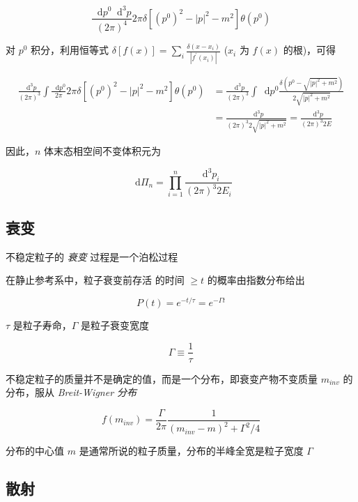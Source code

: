 \documentclass[oneside,a4paper,openany,11pt]{ctexbook}
\newcommand*{\dif}{\mathop{}\!\mathrm{d}} %
\begin{document}
\begin{equation}
    \frac{\dif p^0 \dif^3 p}{(2\pi)^4} 2\pi\delta [(p^0)^2-|p|^2-m^2] \theta(p^0)
\end{equation}

对 $p^0$ 积分，利用恒等式 $\delta[f(x)] = \sum_i \frac{\delta(x-x_i)}{|f^\prime(x_i)|}$ ($x_i$ 为 $f(x)$ 的根)，可得

\begin{align}
    \frac{\dif^3 p}{(2\pi)^3} \int \frac{\dif p^0}{2\pi} 2\pi\delta[(p^0)^2-|p|^2-m^2] \theta(p^0) &= \frac{\dif^3 p}{(2\pi)^3} \int \dif p^0 \frac{\delta(p^0-\sqrt{|p|^2+m^2})}{2\sqrt{|p|^2+m^2}} \\
    &= \frac{\dif^3 p}{(2\pi)^3 2\sqrt{|p|^2+m^2}} = \frac{\dif^3 p}{(2\pi)^3 2E}
\end{align}

因此，$n$ 体末态相空间不变体积元为

\begin{equation}
    \dif \Pi_n = \prod_{i=1}^n \frac{\dif^3 p_i}{(2\pi)^3 2E_i}
\end{equation}

\subsection{衰变}

不稳定粒子的 \emph{衰变} 过程是一个泊松过程

在静止参考系中，粒子衰变前存活 的时间 $\ge t$ 的概率由指数分布给出

\begin{equation}
    P(t) = e^{-t/\tau} = e^{-\Gamma t}
\end{equation}

$\tau$ 是粒子寿命，$\Gamma$ 是粒子衰变宽度

\begin{equation}
    \Gamma \equiv \frac{1}{\tau}
\end{equation}

不稳定粒子的质量并不是确定的值，而是一个分布，即衰变产物不变质量 $m_{inv}$ 的分布，服从 \emph{Breit-Wigner 分布}

\begin{equation}
    f(m_{inv}) = \frac{\Gamma}{2\pi} \frac{1}{(m_{inv}-m)^2+\Gamma^2/4}
\end{equation}

分布的中心值 $m$ 是通常所说的粒子质量，分布的半峰全宽是粒子宽度 $\Gamma$

\subsection{散射}
\end{document}
